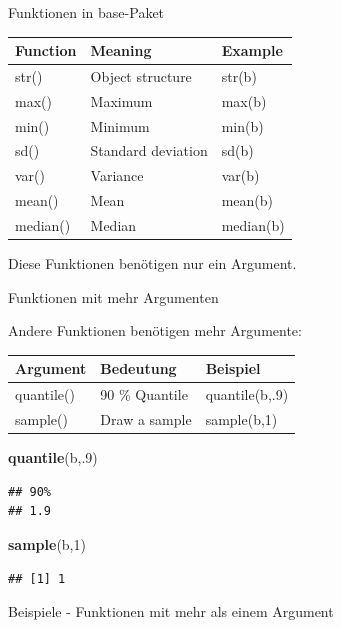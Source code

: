 \documentclass[ignorenonframetext,]{beamer}
\newenvironment{Shaded}{\begin{snugshade}}{\end{snugshade}}
\newcommand{\KeywordTok}[1]{\textcolor[rgb]{0.13,0.29,0.53}{\textbf{#1}}}
\newcommand{\DecValTok}[1]{\textcolor[rgb]{0.00,0.00,0.81}{#1}}
\newcommand{\NormalTok}[1]{#1}
\begin{document}
\begin{frame}{Funktionen in base-Paket}

\begin{longtable}[]{@{}lll@{}}
\toprule
Function & Meaning & Example\tabularnewline
\midrule
\endhead
str() & Object structure & str(b)\tabularnewline
max() & Maximum & max(b)\tabularnewline
min() & Minimum & min(b)\tabularnewline
sd() & Standard deviation & sd(b)\tabularnewline
var() & Variance & var(b)\tabularnewline
mean() & Mean & mean(b)\tabularnewline
median() & Median & median(b)\tabularnewline
\bottomrule
\end{longtable}

Diese Funktionen benötigen nur ein Argument.

\end{frame}

\begin{frame}[fragile]{Funktionen mit mehr Argumenten}

\begin{block}{Andere Funktionen benötigen mehr Argumente:}

\begin{longtable}[]{@{}lll@{}}
\toprule
Argument & Bedeutung & Beispiel\tabularnewline
\midrule
\endhead
quantile() & 90 \% Quantile & quantile(b,.9)\tabularnewline
sample() & Draw a sample & sample(b,1)\tabularnewline
\bottomrule
\end{longtable}

\begin{Shaded}
\begin{Highlighting}[]
\KeywordTok{quantile}\NormalTok{(b,.}\DecValTok{9}\NormalTok{)}
\end{Highlighting}
\end{Shaded}

\begin{verbatim}
## 90% 
## 1.9
\end{verbatim}

\begin{Shaded}
\begin{Highlighting}[]
\KeywordTok{sample}\NormalTok{(b,}\DecValTok{1}\NormalTok{) }
\end{Highlighting}
\end{Shaded}

\begin{verbatim}
## [1] 1
\end{verbatim}

\end{block}

\begin{block}{Beispiele - Funktionen mit mehr als einem Argument}


\end{block}
\end{frame}
\end{document}
